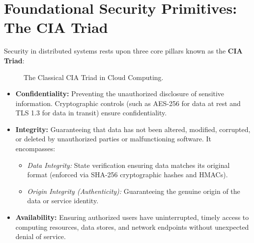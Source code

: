 \documentclass[11pt,a4paper,openany]{report}
\begin{document}
\section{Foundational Security Primitives: The CIA Triad}
Security in distributed systems rests upon three core pillars known as the \textbf{CIA Triad}:
\begin{figure}[H]
\centering
{}
\caption{The Classical CIA Triad in Cloud Computing.}
\end{figure}

\begin{itemize}[leftmargin=*]
  \item \textbf{Confidentiality:} Preventing the unauthorized disclosure of sensitive information. Cryptographic controls (such as AES-256 for data at rest and TLS 1.3 for data in transit) ensure confidentiality.
  \item \textbf{Integrity:} Guaranteeing that data has not been altered, modified, corrupted, or deleted by unauthorized parties or malfunctioning software. It encompasses:
    \begin{itemize}
      \item \emph{Data Integrity:} State verification ensuring data matches its original format (enforced via SHA-256 cryptographic hashes and HMACs).
      \item \emph{Origin Integrity (Authenticity):} Guaranteeing the genuine origin of the data or service identity.
    \end{itemize}
  \item \textbf{Availability:} Ensuring authorized users have uninterrupted, timely access to computing resources, data stores, and network endpoints without unexpected denial of service.
\end{itemize}
\end{document}
